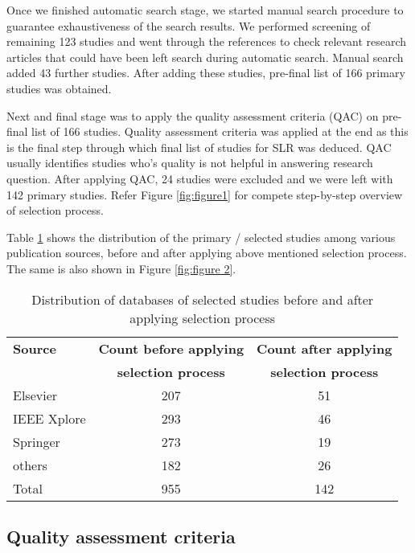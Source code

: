 \documentclass{article}
\begin{document}
Once we finished automatic search stage, we started manual search procedure to guarantee exhaustiveness of the search results.  We performed screening of remaining 123 studies and went through the references to check relevant research articles that could have been left search during automatic search. Manual search added 43 further studies. After adding these studies, pre-final list of 166 primary studies was obtained. 


Next and final stage was to apply the quality assessment criteria (QAC) on pre-final list of 166 studies. Quality assessment criteria was applied at the end as this is the final step through which final list of studies for SLR was deduced. QAC usually identifies studies who's quality is not helpful in answering research question. After applying QAC, 24 studies were excluded and we were left with 142 primary studies. Refer Figure \ref{fig:figure1} for compete step-by-step overview of selection process. 


Table \ref{Tab: Table 1} shows the distribution of the primary / selected studies among various publication sources, before and after applying above mentioned selection process. The same is also shown in Figure \ref{fig:figure 2}. 



\begin{table} [!htb]
\centering

\caption{Distribution of databases of selected studies before and after applying selection process}
\begin{tabular}{ | l | c | c | }    \hline
\textbf{Source} &\textbf{Count before applying } &\textbf{Count after applying} \\
 &\textbf{selection process} &\textbf{selection process}\\ \hline

Elsevier & 207 & 51 \\ \hline
IEEE Xplore & 293& 46 \\ \hline
Springer& 273 & 19 \\ \hline
others & 182 & 26 \\ \hline
Total & 955 & 142 \\ \hline 

\end{tabular}
\label{Tab: Table 1}
\end{table}






\subsection{Quality assessment criteria}
\end{document}
